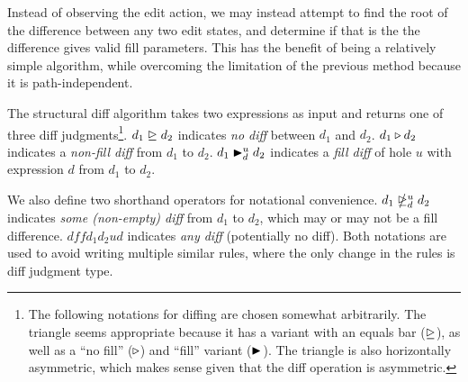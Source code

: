 Instead of observing the edit action, we may instead attempt to find the root of the difference between any two edit states, and determine if that is the the difference gives valid fill parameters. This has the benefit of being a relatively simple algorithm, while overcoming the limitation of the previous method because it is path-independent.

The structural diff algorithm takes two expressions as input and returns one of three diff judgments\footnote{The following notations for diffing are chosen somewhat arbitrarily. The triangle seems appropriate because it has a variant with an equals bar ($\nodiff{}{}$), as well as a ``no fill'' ($\nfdiff{}{}{}{}$) and ``fill'' variant ($\fdiff{}{}{}{}$). The triangle is also horizontally asymmetric, which makes sense given that the diff operation is asymmetric.}. $\nodiff{d_1}{d_2}$ indicates \textit{no diff} between $d_1$ and $d_2$. $\nfdiff{d_1}{d_2}$ indicates a \textit{non-fill diff} from $d_1$ to $d_2$. $\fdiff{d_1}{d_2}{u}{d}$ indicates a \textit{fill diff} of hole $u$ with expression $d$ from $d_1$ to $d_2$.

We also define two shorthand operators for notational convenience. $\fnfdiff{d_1}{d_2}{u}{d}$ indicates \textit{some (non-empty) diff} from $d_1$ to $d_2$, which may or may not be a fill difference. $dff{d_1}{d_2}{u}{d}$ indicates \textit{any diff} (potentially no diff). Both notations are used to avoid writing multiple similar rules, where the only change in the rules is diff judgment type.


\begin{singlespace}

\end{singlespace}

